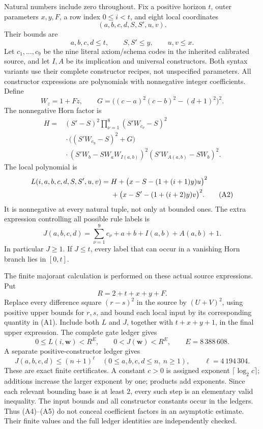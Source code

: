Natural numbers include zero throughout.  Fix a positive horizon \(t\),
outer parameters \(x,y,F\), a row index \(0\le i<t\), and eight local
coordinates
\[
 (a,b,c,d,S,S',u,v).
\]
Their bounds are
\[
 a,b,c,d\le t,\qquad S,S'\le y,\qquad u,v\le x.             \tag{A1}
\]
Let \(c_1,\ldots,c_9\) be the nine literal axiom/schema codes in the
inherited calibrated source, and let \(I,A\) be its implication and
universal constructors.  Both syntax variants use their complete
constructor recipes, not unspecified parameters.  All constructor
expressions are polynomials with nonnegative integer coefficients.
Define
\[
 W_z=1+Fz,\qquad
 G=\bigl((c-a)^2(c-b)^2-(d+1)^2\bigr)^2.
\]
The nonnegative Horn factor is
\begin{align*}
 H={}&(S'-S)^2
       \prod_{\nu=1}^{8}(S'W_{c_\nu}-S)^2\\
    &{}\cdot\bigl((S'W_{c_9}-S)^2+G\bigr)\\
    &{}\cdot(S'W_b-SW_aW_{I(a,b)})^2
       (S'W_{A(a,b)}-SW_b)^2 .
\end{align*}
The local polynomial is
\begin{align}
 L(i,a,b,c,d,S,S',u,v)
   ={}&H+\bigl(x-S-(1+(i+1)y)u\bigr)^2 \notag\\
      &+\bigl(x-S'-(1+(i+2)y)v\bigr)^2.                  \tag{A2}
\end{align}
It is nonnegative at every natural tuple, not only at bounded ones.
The extra expression controlling all possible rule labels is
\[
 J(a,b,c,d)=\sum_{\nu=1}^{9}c_\nu+a+b+I(a,b)+A(a,b)+1.     \tag{A3}
\]
In particular \(J\ge1\).  If \(J\le t\), every label that can occur in
a vanishing Horn branch lies in \([0,t]\).

The finite majorant calculation is performed on these actual source
expressions.  Put
\[
 R=2+t+x+y+F.
\]
Replace every difference square \((r-s)^2\) in the source by
\((U+V)^2\), using positive upper bounds for \(r,s\), and bound each local
input by its corresponding quantity in (A1).  Include both \(L\) and
\(J\), together with \(t+x+y+1\), in the final upper expression.  The
complete gate ledger gives
\[
 0\le L(i,\mathbf w)<R^E,\qquad
 0<J(\mathbf w)<R^E,\qquad E=8\,388\,608.                 \tag{A4}
\]
A separate positive-constructor ledger gives
\[
 J(a,b,c,d)\le(n+1)^\ell
 \quad(0\le a,b,c,d\le n,\ n\ge1),\qquad
 \ell=4\,194\,304.                                      \tag{A5}
\]
These are exact finite certificates.  A constant \(c>0\) is assigned
exponent \(\lceil\log_2 c\rceil\); additions increase the larger
exponent by one; products add exponents.  Since each relevant bounding
base is at least \(2\), every such step is an elementary valid
inequality.  The input bounds and all constructor constants occur in
the ledgers.  Thus (A4)--(A5) do not conceal coefficient factors in an
asymptotic estimate.  Their finite values and the full ledger identities
are independently checked.

